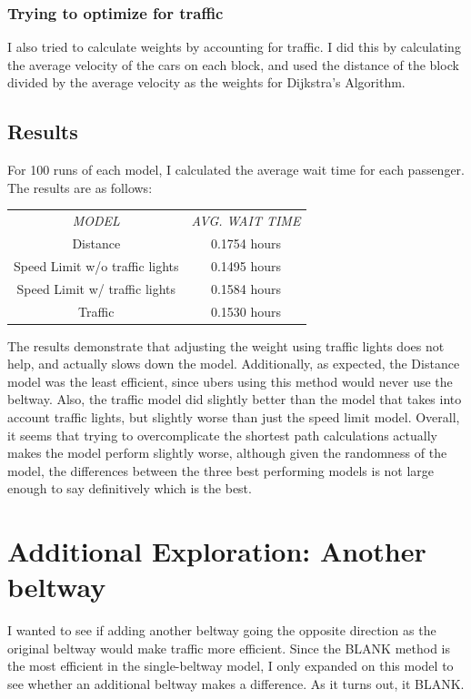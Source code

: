 \documentclass{article}
\begin{document}
\subsubsection{Trying to optimize for traffic}
I also tried to calculate weights by accounting for traffic. I did this by calculating the average velocity of the cars on each block, and used the distance of the block divided by the average velocity as the weights for Dijkstra's Algorithm.

\subsection{Results}
For 100 runs of each model, I calculated the average wait time for each passenger. The results are as follows:

\begin{center}
\begin{tabular}{ |c|c| } 
 \hline
 \textit{MODEL} & \textit{AVG. WAIT TIME} \\ 
 Distance & 0.1754 hours \\ 
 Speed Limit w/o traffic lights & 0.1495 hours\\
 Speed Limit w/ traffic lights & 0.1584 hours\\
 Traffic &  0.1530 hours\\
 \hline
\end{tabular}
\end{center}

The results demonstrate that adjusting the weight using traffic lights does not help, and actually slows down the model. Additionally, as expected, the Distance model was the least efficient, since ubers using this method would never use the beltway. Also, the traffic model did slightly better than the model that takes into account traffic lights, but slightly worse than just the speed limit model. Overall, it seems that trying to overcomplicate the shortest path calculations actually makes the model perform slightly worse, although given the randomness of the model, the differences between the three best performing models is not large enough to say definitively which is the best.

\section{Additional Exploration: Another beltway}
I wanted to see if adding another beltway going the opposite direction as the original beltway would make traffic more efficient. Since the BLANK method is the most efficient in the single-beltway model, I only expanded on this model to see whether an additional beltway makes a difference. As it turns out, it BLANK.
\end{document}
